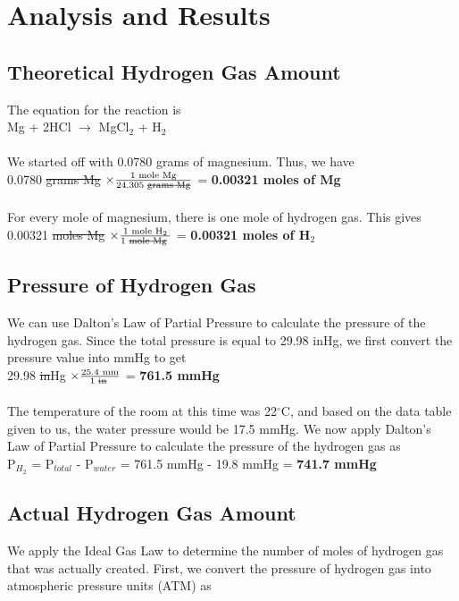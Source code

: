 \documentclass[11pt]{article}
\begin{document}
\section{Analysis and Results}
\subsection{Theoretical Hydrogen Gas Amount}
The equation for the reaction is \\

Mg + 2HCl $\rightarrow$ MgCl$_{2}$ + H$_{2}$ 
\\ \\
We started off with 0.0780 grams of magnesium. Thus, we have \\

0.0780 \sout{grams Mg} $\times \frac{\textrm{1 mole Mg}}{\textrm{24.305 \sout{grams Mg}}}$ = \textbf{0.00321 moles of Mg}
\\ \\
For every mole of magnesium, there is one mole of hydrogen gas. This gives \\

0.00321 \sout{moles Mg} $\times \frac{\textrm{1 mole H$_{2}$}}{\textrm{1 \sout{mole Mg} }}$ = \textbf{0.00321 moles of H$_{2}$} 
\\
\subsection{Pressure of Hydrogen Gas}
We can use Dalton's Law of Partial Pressure to calculate the pressure of the hydrogen gas. Since the total pressure is equal to 29.98 inHg, we first convert the pressure value into mmHg to get \\

29.98 \sout{in}Hg $\times \frac{\textrm{25.4 mm}}{\textrm{1 \sout{in} }}$ = \textbf{761.5 mmHg} 
\\ \\
The temperature of the room at this time was 22$^\circ$C, and based on the data table given to us, the water pressure would be 17.5 mmHg. We now apply Dalton's Law of Partial Pressure to calculate the pressure of the hydrogen gas as \\

P$_{H_{2}}$ = P$_{total}$ - P$_{water}$ = 761.5 mmHg - 19.8 mmHg = \textbf{741.7 mmHg}
\\
\subsection{Actual Hydrogen Gas Amount}
We apply the Ideal Gas Law to determine the number of moles of hydrogen gas that was actually created. First, we convert the pressure of hydrogen gas into atmospheric pressure units (ATM) as \\
\end{document}

